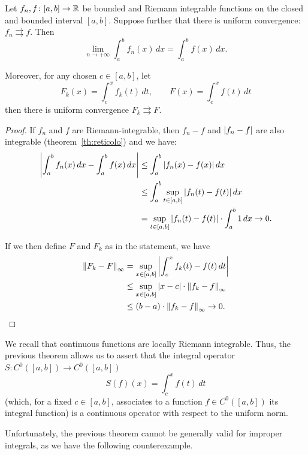 \begin{theorem}%
  \label{th:scambio_limite_integrale}%
  \mymark{***}%
    Let $f_n,f\colon [a,b] \to {\mathbb R}$ be bounded and Riemann integrable functions
  on the closed and bounded interval $[a,b]$. Suppose further that there is
  uniform convergence: $f_n \rightrightarrows f$. Then
  \[
      \lim_{n\to+\infty} \int_a^b f_n(x)\, dx 
      = \int_a^b f(x)\, dx.
  \]

  Moreover, for any chosen $c\in [a,b]$, let
  \[
    F_k(x) = \int_{c}^x f_k(t)\, dt,
    \qquad
    F(x) = \int_{c}^x f(t)\, dt
  \]
  then there is uniform convergence $F_k \rightrightarrows F$.
\end{theorem}
\begin{proof}
    If $f_n$ and $f$ are Riemann-integrable, then $f_n-f$ and ${\left|f_n-f\right|}$ are
  also integrable (theorem~\ref{th:reticolo}) and we have:
  \begin{align*}
    {\left|\int_a^b f_n(x)\, dx - \int_a^b f(x)\, dx\right|}
    &\le \int_a^b {\left|f_n(x)-f(x)\right|}\, dx \\
    &\le \int_a^b \sup_{t\in[a,b]} {\left|f_n(t)-f(t)\right|}\, dx \\
    &= \sup_{t\in [a,b]}{\left|f_n(t)-f(t)\right|}\cdot \int_a^b 1\, dx
    \to 0.
  \end{align*}

  If we then define $F$ and $F_k$ as in the statement, we have
  \begin{align*}
  {\left\Vert F_k-F\right\Vert}_\infty
  &= \sup_{x\in [a,b]} {\left|\int_c^x f_k(t)-f(t)\, dt\right|} \\
  &\le \sup_{x\in [a,b]} {\left|x-c\right|} \cdot {\left\Vert f_k-f\right\Vert}_\infty \\
  &\le (b-a) \cdot {\left\Vert f_k-f\right\Vert}_\infty
  \to 0.
  \end{align*}
\end{proof}
  
We recall that continuous functions are locally Riemann integrable. Thus, the
previous theorem allows us to assert that the integral operator $S\colon
C^0([a,b]) \to C^0([a,b])$
\[
S(f)(x) = \int_{c}^x f(t)\, dt
\]
(which, for a fixed $c \in [a,b]$, associates to a function $f\in C^0([a,b])$
its integral function) is a continuous operator with respect to the uniform
norm.

Unfortunately, the previous theorem cannot be generally valid for improper
integrals, as we have the following counterexample.

